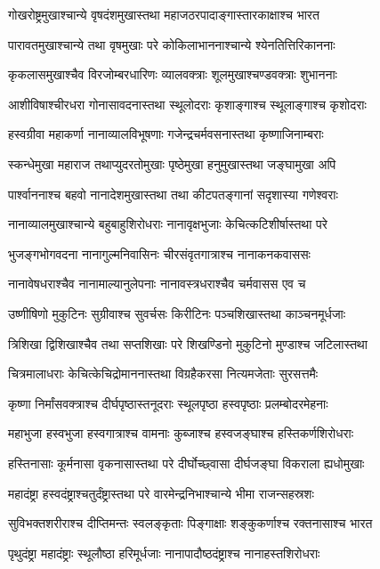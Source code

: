 \twolineshloka
{गोखरोष्ट्रमुखाश्चान्ये वृषदंशमुखास्तथा}
{महाजठरपादाङ्गास्तारकाक्षाश्च भारत}


\twolineshloka
{पारावतमुखाश्चान्ये तथा वृषमुखाः परे}
{कोकिलाभाननाश्चान्ये श्येनतित्तिरिकाननाः}


\twolineshloka
{कृकलासमुखाश्चैव विरजोम्बरधारिणः}
{व्यालवक्त्राः शूलमुखाश्चण्डवक्त्राः शुभाननाः}


\twolineshloka
{आशीविषाश्चीरधरा गोनासावदनास्तथा}
{स्थूलोदराः कृशाङ्गाश्च स्थूलाङ्गाश्च कृशोदराः}


\twolineshloka
{हस्वग्रीवा महाकर्णा नानाव्यालविभूषणाः}
{गजेन्द्रचर्मवसनास्तथा कृष्णाजिनाम्बराः}


\twolineshloka
{स्कन्धेमुखा महाराज तथाप्युदरतोमुखाः}
{पृष्ठेमुखा हनुमुखास्तथा जङ्घामुखा अपि}


\twolineshloka
{पार्श्वाननाश्च बहवो नानादेशमुखास्तथा}
{तथा कीटपतङ्गानां सदृशास्या गणेश्वराः}


\twolineshloka
{नानाव्यालमुखाश्चान्ये बहुबाहुशिरोधराः}
{नानावृक्षभुजाः केचित्कटिशीर्षास्तथा परे}


\twolineshloka
{भुजङ्गभोगवदना नानागुल्मनिवासिनः}
{चीरसंवृतगात्राश्च नानाकनकवाससः}


\twolineshloka
{नानावेषधराश्चैव नानामाल्यानुलेपनाः}
{नानावस्त्रधराश्चैव चर्मवासस एव च}


\twolineshloka
{उष्णीषिणो मुकुटिनः सुग्रीवाश्च सुवर्चसः}
{किरीटिनः पञ्चशिखास्तथा काञ्चनमूर्धजाः}


\twolineshloka
{त्रिशिखा द्विशिखाश्चैव तथा सप्तशिखाः परे}
{शिखण्डिनो मुकुटिनो मुण्डाश्च जटिलास्तथा}


\twolineshloka
{चित्रमालाधराः केचित्केचिद्रोमाननास्तथा}
{विग्रहैकरसा नित्यमजेताः सुरसत्तमैः}


\twolineshloka
{कृष्णा निर्मांसवक्त्राश्च दीर्घपृष्ठास्तनूदराः}
{स्थूलपृष्ठा हस्वपृष्ठाः प्रलम्बोदरमेहनाः}


\twolineshloka
{महाभुजा हस्वभुजा हस्वगात्राश्च वामनाः}
{कुब्जाश्च हस्वजङ्घाश्च हस्तिकर्णशिरोधराः}


\twolineshloka
{हस्तिनासाः कूर्मनासा वृकनासास्तथा परे}
{दीर्घोच्छ्वासा दीर्घजङ्घा विकराला ह्यधोमुखाः}


\twolineshloka
{महादंष्ट्रा हस्वदंष्ट्राश्चतुर्दंष्ट्रास्तथा परे}
{वारमेन्द्रनिभाश्चान्ये भीमा राजन्सहस्रशः}


\twolineshloka
{सुविभक्तशरीराश्च दीप्तिमन्तः स्वलङ्कृताः}
{पिङ्गाक्षाः शङ्कुकर्णाश्च रक्तनासाश्च भारत}


\twolineshloka
{पृथुदंष्ट्रा महादंष्ट्राः स्थूलौष्ठा हरिमूर्धजाः}
{नानापादौष्ठदंष्ट्राश्च नानाहस्तशिरोधराः}


